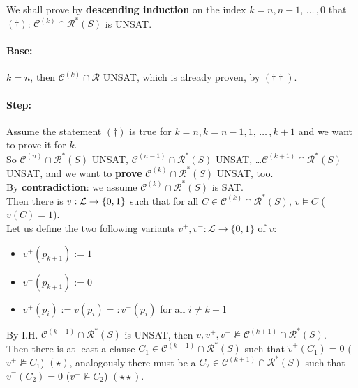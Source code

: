 \newpage

We shall prove by \textbf{descending induction} on the index $k = n, n-1, \, \dots \, , 0$ that $(\dag)$: $\mathcal{C}^{(k)} \cap \mathcal{R}^\ast (S)$ is UNSAT.\\

\paragraph{Base:} $k=n$, then $\mathcal{C}^{(k)} \cap \mathcal{R}$ UNSAT, which is already proven, by $(\dag\dag)$.\\

\paragraph{Step:} Assume the statement $(\dag)$ is true for $k=n, k=n-1, 1, \, \dots \, , k+1$ and we want to prove it for $k$. \\
So $\mathcal{C}^{(n)} \cap \mathcal{R}^\ast (S)$ UNSAT, $\mathcal{C}^{(n-1)} \cap \mathcal{R}^\ast (S)$ UNSAT, \dots  $\mathcal{C}^{(k+1)} \cap \mathcal{R}^\ast (S)$ UNSAT, and we want to \textbf{prove} $\mathcal{C}^{(k)} \cap \mathcal{R}^\ast (S)$ UNSAT, too.\\

By \textbf{contradiction}: we assume $\mathcal{C}^{(k)} \cap \mathcal{R}^\ast (S)$ is SAT.\\
Then there is $v: \mathcal{L} \rightarrow \{0,1\}$ such that for all $C \in \mathcal{C}^{(k)} \cap \mathcal{R}^\ast (S)$, $v \models C$ ($\tilde v(C) = 1$).\\

Let us define the two following variants $v^+, v^- : \mathcal{L} \rightarrow \{0,1\}$ of $v$: 
\begin{itemize}
	\item $v^+ (p_{k+1}) := 1$
	\item $v^- (p_{k+1}) := 0$
	\item $v^+ (p_i) := v(p_i) =: v^- (p_i)$ for all $i \neq k+1$
\end{itemize}

By I.H. $\mathcal{C}^{(k+1)} \cap \mathcal{R}^\ast (S)$ is UNSAT, then $v, v^+, v^- \not \models \mathcal{C}^{(k+1)} \cap \mathcal{R}^\ast (S)$.\\

Then there is at least a clause $C_1 \in \mathcal{C}^{(k+1)} \cap \mathcal{R}^\ast (S)$ such that $\tilde v^+ (C_1) = 0$ ($v^+ \not \models C_1$) $(\star)$, analogously there must be a $C_2 \in \mathcal{C}^{(k+1)} \cap \mathcal{R}^\ast (S)$ such that $\tilde v^- (C_2) = 0$ ($v^- \not \models C_2$) $(\star \star)$.\\


